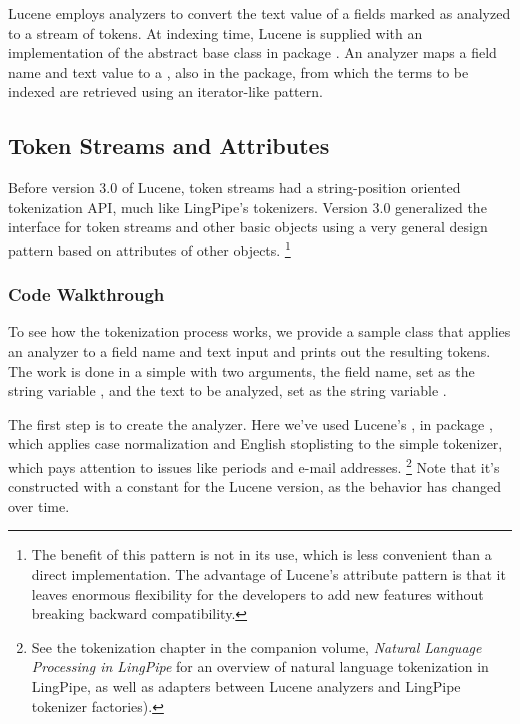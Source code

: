 Lucene employs analyzers to convert the text value
of a fields marked as analyzed to a stream of tokens.  At indexing
time, Lucene is supplied with an implementation of the abstract base
class  in package .
An analyzer maps a field name and text value to a ,
also in the  package, from which the terms to be
indexed are retrieved using an iterator-like pattern.

\subsection{Token Streams and Attributes}

Before version 3.0 of Lucene, token streams had a string-position
oriented tokenization API, much like LingPipe's tokenizers.  Version
3.0 generalized the interface for token streams and other basic
objects using a very general design pattern based on attributes of
other objects.
%
\footnote{The benefit of this pattern is not in its use, which is less
  convenient than a direct implementation.  The advantage of Lucene's
  attribute pattern is that it leaves enormous flexibility for the
  developers to add new features without breaking backward
  compatibility.}

\subsubsection{Code Walkthrough}

To see how the tokenization process works,
we provide a sample class  that applies an
analyzer to a field name and text input and prints out the resulting
tokens.  The work is done in a simple  with two
arguments, the field name, set as the string variable
, and the text to be analyzed, set as the string
variable .

The first step is to create the analyzer.
%
%
Here we've used Lucene's , in package
, which applies case
normalization and English stoplisting to the simple tokenizer, which
pays attention to issues like periods and e-mail addresses.%
%
\footnote{See the tokenization chapter in the companion volume, {\it
    Natural Language Processing in LingPipe} for an overview of
  natural language tokenization in LingPipe, as well as adapters
  between Lucene analyzers and LingPipe tokenizer factories).}
%
Note that it's constructed with a constant for the Lucene version, as
the behavior has changed over time.

